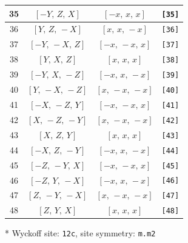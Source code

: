 \documentclass[fleqn,8pt]{jsarticle}
\begin{document}
\begin{longtable}{cccc}
35 & $\left[ - Y,\, Z,\, X \right]$ & $\left[ - x,\, x,\, x \right]$ & {\tt [35]} \\ \hline
36 & $\left[ Y,\, Z,\, - X \right]$ & $\left[ x,\, x,\, - x \right]$ & {\tt [36]} \\ \hline
37 & $\left[ - Y,\, - X,\, Z \right]$ & $\left[ - x,\, - x,\, x \right]$ & {\tt [37]} \\ \hline
38 & $\left[ Y,\, X,\, Z \right]$ & $\left[ x,\, x,\, x \right]$ & {\tt [38]} \\ \hline
39 & $\left[ - Y,\, X,\, - Z \right]$ & $\left[ - x,\, x,\, - x \right]$ & {\tt [39]} \\ \hline
40 & $\left[ Y,\, - X,\, - Z \right]$ & $\left[ x,\, - x,\, - x \right]$ & {\tt [40]} \\ \hline
41 & $\left[ - X,\, - Z,\, Y \right]$ & $\left[ - x,\, - x,\, x \right]$ & {\tt [41]} \\ \hline
42 & $\left[ X,\, - Z,\, - Y \right]$ & $\left[ x,\, - x,\, - x \right]$ & {\tt [42]} \\ \hline
43 & $\left[ X,\, Z,\, Y \right]$ & $\left[ x,\, x,\, x \right]$ & {\tt [43]} \\ \hline
44 & $\left[ - X,\, Z,\, - Y \right]$ & $\left[ - x,\, x,\, - x \right]$ & {\tt [44]} \\ \hline
45 & $\left[ - Z,\, - Y,\, X \right]$ & $\left[ - x,\, - x,\, x \right]$ & {\tt [45]} \\ \hline
46 & $\left[ - Z,\, Y,\, - X \right]$ & $\left[ - x,\, x,\, - x \right]$ & {\tt [46]} \\ \hline
47 & $\left[ Z,\, - Y,\, - X \right]$ & $\left[ x,\, - x,\, - x \right]$ & {\tt [47]} \\ \hline
48 & $\left[ Z,\, Y,\, X \right]$ & $\left[ x,\, x,\, x \right]$ & {\tt [48]} \\
\end{longtable}
* Wyckoff site: {\tt 12c}, site symmetry: {\tt m.m2}
\renewcommand{\arraystretch}{1.2}
\end{document}
